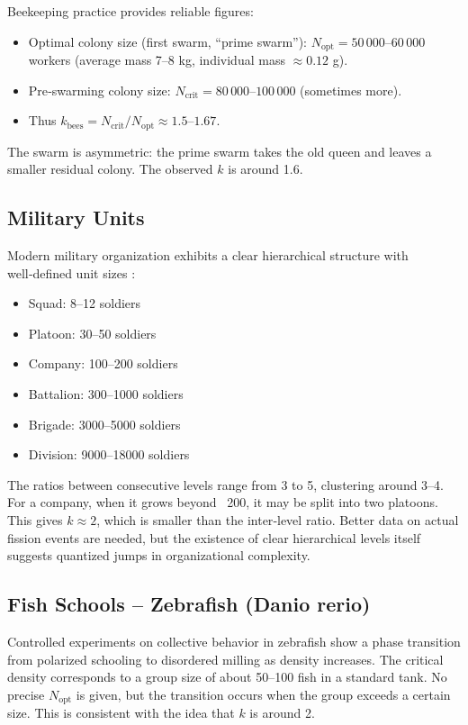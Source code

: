 \documentclass[12pt]{article}
\theoremstyle{remark}
\begin{document}
	Beekeeping practice provides reliable figures:
	\begin{itemize}
		\item Optimal colony size (first swarm, ``prime swarm''): $N_{\text{opt}} = 50\,000$–$60\,000$ workers (average mass 7–8 kg, individual mass $\approx 0.12$ g). \cite{Seeley2010, Winston1987}
		\item Pre‑swarming colony size: $N_{\text{crit}} = 80\,000$–$100\,000$ (sometimes more). \cite{bees}
		\item Thus $k_{\text{bees}} = N_{\text{crit}}/N_{\text{opt}} \approx 1.5$–$1.67$.
	\end{itemize}
	The swarm is asymmetric: the prime swarm takes the old queen and leaves a smaller residual colony. The observed $k$ is around 1.6.
	
	\subsection{Military Units}
	\label{subsec:military}
	
	Modern military organization exhibits a clear hierarchical structure with well‑defined unit sizes \cite{FM3-90.5}:
	\begin{itemize}
		\item Squad: 8–12 soldiers
		\item Platoon: 30–50 soldiers
		\item Company: 100–200 soldiers
		\item Battalion: 300–1000 soldiers
		\item Brigade: 3000–5000 soldiers
		\item Division: 9000–18000 soldiers
	\end{itemize}
	The ratios between consecutive levels range from 3 to 5, clustering around 3–4. For a company, when it grows beyond ~200, it may be split into two platoons. This gives $k \approx 2$, which is smaller than the inter‑level ratio. Better data on actual fission events are needed, but the existence of clear hierarchical levels itself suggests quantized jumps in organizational complexity.
	
	\subsection{Fish Schools – Zebrafish (Danio rerio)}
	\label{subsec:fish}
	
	Controlled experiments on collective behavior in zebrafish \cite{Tunstrom2013} show a phase transition from polarized schooling to disordered milling as density increases. The critical density corresponds to a group size of about 50–100 fish in a standard tank. No precise $N_{\text{opt}}$ is given, but the transition occurs when the group exceeds a certain size. This is consistent with the idea that $k$ is around 2.
	
\end{document}
